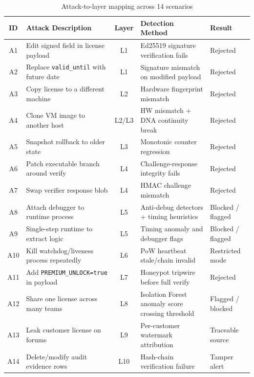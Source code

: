 \documentclass[11pt,a4paper]{article}
\begin{document}
\begin{table}[H]
\centering
\caption{Attack-to-layer mapping across 14 scenarios}
\small
\begin{tabularx}{\textwidth}{c Y c Y Y}
\toprule
\textbf{ID} & \textbf{Attack Description} & \textbf{Layer} & \textbf{Detection Method} & \textbf{Result} \\
\midrule
{}
A1 & Edit signed field in license payload & L1 & Ed25519 signature verification fails & Rejected \\
A2 & Replace \texttt{valid\_until} with future date & L1 & Signature mismatch on modified payload & Rejected \\
A3 & Copy license to a different machine & L2 & Hardware fingerprint mismatch & Rejected \\
A4 & Clone VM image to another host & L2/L3 & HW mismatch + DNA continuity break & Rejected \\
A5 & Snapshot rollback to older state & L3 & Monotonic counter regression & Rejected \\
A6 & Patch executable branch around verify & L4 & Challenge-response integrity fails & Rejected \\
A7 & Swap verifier response blob & L4 & HMAC challenge mismatch & Rejected \\
A8 & Attach debugger to runtime process & L5 & Anti-debug detectors + timing heuristics & Blocked / flagged \\
A9 & Single-step runtime to extract logic & L5 & Timing anomaly and debugger flags & Blocked / flagged \\
A10 & Kill watchdog/liveness process repeatedly & L6 & PoW heartbeat stale/chain invalid & Restricted mode \\
A11 & Add \texttt{PREMIUM\_UNLOCK=true} in payload & L7 & Honeypot tripwire before full verify & Rejected \\
A12 & Share one license across many teams & L8 & Isolation Forest anomaly score crossing threshold & Flagged / blocked \\
A13 & Leak customer license on forums & L9 & Per-customer watermark attribution & Traceable source \\
A14 & Delete/modify audit evidence rows & L10 & Hash-chain verification failure & Tamper alert \\
\bottomrule
\end{tabularx}
\end{table}
\end{document}
